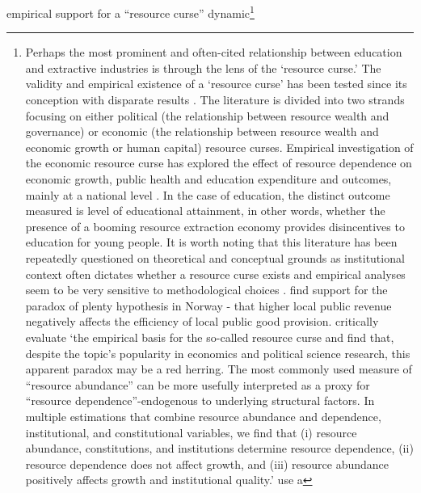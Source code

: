 \documentclass[
  10pt,
]{article}
\begin{document}
empirical support for a ``resource curse'' dynamic\footnote{Perhaps the
  most prominent and often-cited relationship between education and
  extractive industries is through the lens of the `resource curse.' The
  validity and empirical existence of a `resource curse' has been tested
  since its conception with disparate results
  \autocite{ahlerup2020,badeeb2017,blanco2012,borge2015,brunnschweiler2008,cockx2014,cockx2016,deacon2011,dialga2022,douglas2017,haber,menaldo2016,ross2018,ross2015,sincovich2018,wiens2014}.
  The literature is divided into two strands focusing on either
  political (the relationship between resource wealth and governance)
  \autocite{ross2015,ross2015,wiens2014,deacon2011} or economic (the
  relationship between resource wealth and economic growth or human
  capital) resource curses. Empirical investigation of the economic
  resource curse has explored the effect of resource dependence on
  economic growth, public health and education expenditure and outcomes,
  mainly at a national level
  \autocite{borge2015,cockx2016,douglas2017,sincovich2018}. In the case
  of education, the distinct outcome measured is level of educational
  attainment, in other words, whether the presence of a booming resource
  extraction economy provides disincentives to education for young
  people. It is worth noting that this literature has been repeatedly
  questioned on theoretical and conceptual grounds as institutional
  context often dictates whether a resource curse exists and empirical
  analyses seem to be very sensitive to methodological choices
  \autocite{ross2018,ross2015,dialga2022}. \autocite{borge2015} find
  support for the paradox of plenty hypothesis in Norway - that higher
  local public revenue negatively affects the efficiency of local public
  good provision. \autocite{brunnschweiler2008} critically evaluate `the
  empirical basis for the so-called resource curse and find that,
  despite the topic's popularity in economics and political science
  research, this apparent paradox may be a red herring. The most
  commonly used measure of ``resource abundance'' can be more usefully
  interpreted as a proxy for ``resource dependence''-endogenous to
  underlying structural factors. In multiple estimations that combine
  resource abundance and dependence, institutional, and constitutional
  variables, we find that (i) resource abundance, constitutions, and
  institutions determine resource dependence, (ii) resource dependence
  does not affect growth, and (iii) resource abundance positively
  affects growth and institutional quality.' \autocite{cockx2014} use a
}
\end{document}
